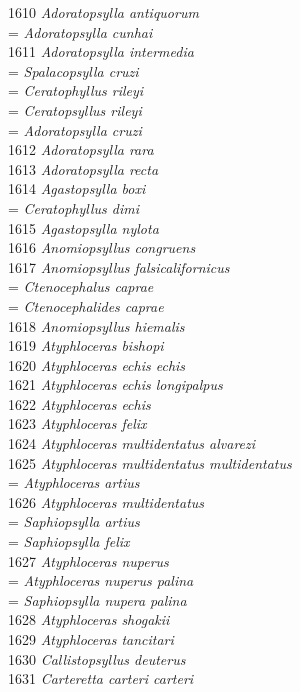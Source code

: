 \documentclass[
]{article}
\begin{document}
1610 \emph{Adoratopsylla antiquorum}\\
= \emph{Adoratopsylla cunhai}\\
1611 \emph{Adoratopsylla intermedia}\\
= \emph{Spalacopsylla cruzi}\\
= \emph{Ceratophyllus rileyi}\\
= \emph{Ceratopsyllus rileyi}\\
= \emph{Adoratopsylla cruzi}\\
1612 \emph{Adoratopsylla rara}\\
1613 \emph{Adoratopsylla recta}\\
1614 \emph{Agastopsylla boxi}\\
= \emph{Ceratophyllus dimi}\\
1615 \emph{Agastopsylla nylota}\\
1616 \emph{Anomiopsyllus congruens}\\
1617 \emph{Anomiopsyllus falsicalifornicus}\\
= \emph{Ctenocephalus caprae}\\
= \emph{Ctenocephalides caprae}\\
1618 \emph{Anomiopsyllus hiemalis}\\
1619 \emph{Atyphloceras bishopi}\\
1620 \emph{Atyphloceras echis echis}\\
1621 \emph{Atyphloceras echis longipalpus}\\
1622 \emph{Atyphloceras echis}\\
1623 \emph{Atyphloceras felix}\\
1624 \emph{Atyphloceras multidentatus alvarezi}\\
1625 \emph{Atyphloceras multidentatus multidentatus}\\
= \emph{Atyphloceras artius}\\
1626 \emph{Atyphloceras multidentatus}\\
= \emph{Saphiopsylla artius}\\
= \emph{Saphiopsylla felix}\\
1627 \emph{Atyphloceras nuperus}\\
= \emph{Atyphloceras nuperus palina}\\
= \emph{Saphiopsylla nupera palina}\\
1628 \emph{Atyphloceras shogakii}\\
1629 \emph{Atyphloceras tancitari}\\
1630 \emph{Callistopsyllus deuterus}\\
1631 \emph{Carteretta carteri carteri}\\
\end{document}
